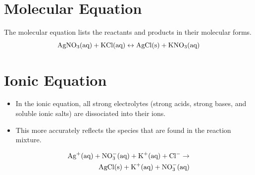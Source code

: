\documentclass[
	chapter=4
]{chem122notes}
\begin{document}
\section{Molecular Equation}\label{sec:molecular-equation}
The molecular equation lists the reactants and products in their molecular forms.
\[ \element{Ag}\element{N}\element{O}[3] (\mbox{aq}) + \element{K}\element{Cl} (\mbox{aq}) \leftrightarrow \element{Ag}\element{Cl} (\mbox{s}) + \element{K}\element{N}\element{O}[3] (\mbox{aq}) \]

\section{Ionic Equation}\label{sec:ionic-equation}
\begin{itemize}
	\item In the ionic equation, all strong electrolytes (strong acids, strong bases, and soluble ionic salts) are dissociated into their ions.
	\item This more accurately reflects the species that are found in the reaction mixture.
\end{itemize}

\begin{equation*}
\begin{aligned}
	\element{Ag}^{+} (\mbox{aq}) + \element{N}\element{O}[3]^{-} (\mbox{aq}) + \element{K}^{+} (\mbox{aq}) + \element{Cl}^{-} \rightarrow\\
	\element{Ag}\element{Cl} (\mbox{s}) + \element{K}^{+} (\mbox{aq}) + \element{N}\element{O}[3]^{-} (\mbox{aq})\\
\end{aligned}
\end{equation*}
\end{document}
